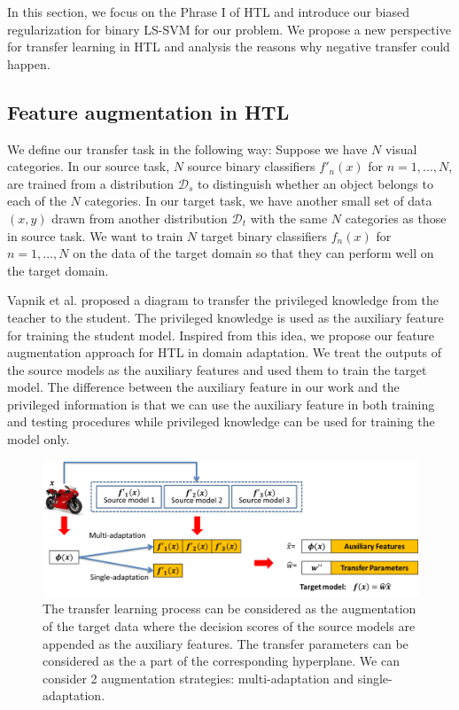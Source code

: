 In this section, we focus on the Phrase I of HTL and introduce our biased regularization for binary LS-SVM for our problem. We propose a new perspective for transfer learning in HTL and analysis the reasons why negative transfer could happen.

\subsection{Feature augmentation in HTL}
We define our transfer task in the following way: Suppose we have $N$ visual categories. 
In our source task, $N$ source binary classifiers $f'_n(x)$ for $n=1,...,N$, are trained from a distribution $\mathcal{D}_s$ to distinguish whether an object belongs to each of the $N$ categories. In our target task, we have another small set of data $(x,y)$ drawn from another distribution $\mathcal{D}_t$ with the same $N$ categories as those in source task. We want to train $N$ target binary classifiers $f_n(x)$ for $n=1,...,N$ on the data of the target domain so that they can perform well on the target domain.

Vapnik et al. \cite{vapnik2015learning} proposed a diagram to transfer the privileged knowledge from the teacher to the student. The privileged knowledge is used as the auxiliary feature for training the student model. Inspired from this idea, we propose our feature augmentation approach for  HTL in domain adaptation. We treat the outputs of the source models as the auxiliary features and used them to train the target model. The difference between the auxiliary feature in our work and the privileged information is that we can use the auxiliary feature in both training and testing procedures while privileged knowledge can be used for training the model only.

\begin{figure}
	\centering
	\includegraphics[scale=0.5]{fig/aug2.png}
	\caption{The transfer learning process can be considered as the augmentation of the target data where the decision scores of the source models are appended as the auxiliary features. The transfer parameters can be considered as the a part of the corresponding hyperplane. We can consider 2 augmentation strategies: multi-adaptation and single-adaptation.}\label{fig:aug}
\end{figure}

